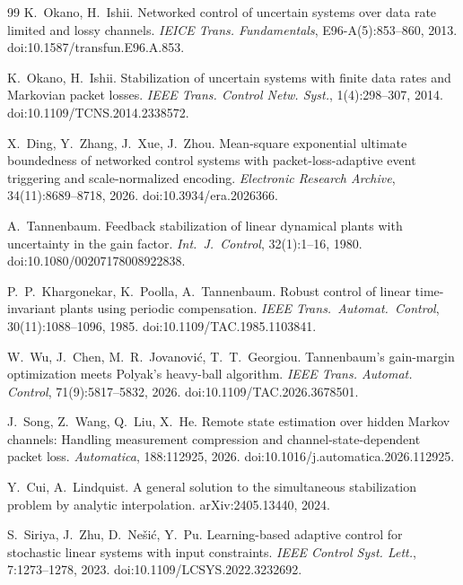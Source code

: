 \documentclass[preprint,12pt,numbers]{elsarticle}
\theoremstyle{definition}
\begin{document}
\begin{thebibliography}{99}
 K.~Okano, H.~Ishii. Networked control of uncertain systems over data rate limited and lossy channels. \emph{IEICE Trans. 
Fundamentals}, E96-A(5):853--860, 2013. doi:10.1587/transfun.E96.A.853.

 K.~Okano, H.~Ishii. Stabilization of uncertain systems with finite data rates and Markovian packet losses. \emph{IEEE Trans. Control Netw. Syst.}, 1(4):298--307, 2014. doi:10.1109/TCNS.2014.2338572.

 X.~Ding, Y.~Zhang, J.~Xue, J.~Zhou. Mean-square exponential ultimate boundedness of networked control systems with packet-loss-adaptive event triggering and scale-normalized encoding. \emph{Electronic Research Archive}, 34(11):8689--8718, 2026. doi:10.3934/era.2026366.


 A.~Tannenbaum. Feedback stabilization of linear dynamical plants with uncertainty in the gain factor. \emph{Int.\ J.\ Control}, 32(1):1--16, 1980. doi:10.1080/00207178008922838.


 P.~P.~Khargonekar, K.~Poolla, A.~Tannenbaum. Robust control of linear time-invariant plants using periodic compensation. \emph{IEEE Trans.\ Automat.\ Control}, 30(11):1088--1096, 1985. doi:10.1109/TAC.1985.1103841.

 W.~Wu, J.~Chen, M.~R.~Jovanovi\'c, T.~T.~Georgiou. Tannenbaum's gain-margin optimization meets Polyak's heavy-ball algorithm. \emph{IEEE Trans. Automat. Control}, 71(9):5817--5832, 2026. doi:10.1109/TAC.2026.3678501.



 J.~Song, Z.~Wang, Q.~Liu, X.~He. Remote state estimation over hidden Markov channels: Handling measurement compression and channel-state-dependent packet loss. \emph{Automatica}, 188:112925, 2026. doi:10.1016/j.automatica.2026.112925.



 Y.~Cui, A.~Lindquist. A general solution to the simultaneous stabilization problem by analytic interpolation. arXiv:2405.13440, 2024.

 S.~Siriya, J.~Zhu, D.~Ne\v{s}i\'c, Y.~Pu. Learning-based adaptive control for stochastic linear systems with input constraints. \emph{IEEE Control Syst. Lett.}, 7:1273--1278, 2023. doi:10.1109/LCSYS.2022.3232692.


\end{thebibliography}
\end{document}
